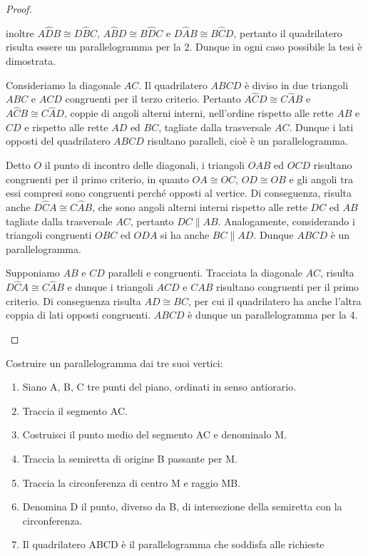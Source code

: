 \begin{proof}
\begin{enumerate*}
		inoltre $A\widehat{D}B\cong D\widehat{B}C$, $A\widehat{B}D\cong 
		B\widehat{D}C$ e $D\widehat{A}B\cong B\widehat{C}D$, pertanto il 
		quadrilatero risulta essere un parallelogramma per la 2. Dunque in 
		ogni caso possibile la tesi è dimostrata.
		\item Consideriamo la diagonale $AC$. Il quadrilatero $ABCD$ è diviso 
		in due triangoli $ABC$ e $ACD$ congruenti per il terzo criterio. 
		Pertanto $A\widehat{C}D\cong C\widehat{A}B$ e $A\widehat{C}B\cong 
		C\widehat{A}D$, coppie di angoli alterni interni, nell'ordine 
		rispetto alle rette $AB$ e $CD$ e rispetto alle rette $AD$ ed $BC$, 
		tagliate dalla trasversale $AC$. Dunque i lati opposti del 
		quadrilatero $ABCD$ risultano paralleli, cioè è un parallelogramma.
		\item Detto $O$ il punto di incontro delle diagonali, i triangoli 
		$OAB$ ed $OCD$ risultano congruenti per il primo criterio, in quanto 
		$OA\cong OC$, $OD\cong OB$ e gli angoli tra essi compresi sono 
		congruenti perché opposti al vertice. Di conseguenza, risulta anche 
		$D\widehat{C}A\cong C\widehat{A}B$, che sono angoli alterni interni 
		rispetto alle rette $DC$ ed $AB$ tagliate dalla trasversale $AC$, 
		pertanto $DC\parallel AB$. Analogamente, considerando i triangoli 
		congruenti $OBC$ ed $ODA$ si ha anche $BC\parallel AD$. Dunque $ABCD$ 
		è un parallelogramma.
		\item Supponiamo $AB$ e $CD$ paralleli e congruenti. Tracciata la 
		diagonale $AC$, risulta $D\widehat{C}A\cong C\widehat{A}B$ e dunque i 
		triangoli $ACD$ e $CAB$ risultano congruenti per il primo criterio. 
		Di conseguenza risulta $AD\cong BC$, per cui il quadrilatero ha anche 
		l'altra coppia di lati opposti congruenti. $ABCD$ è dunque un 
		parallelogramma per la 4.
	\end{enumerate*}
\end{proof}


\begin{procedura}
	Costruire un parallelogramma dai tre suoi vertici:
	\begin{enumerate} [nosep]
		\item 
		Siano A, B, C tre punti del piano, ordinati in senso antiorario.
		\item 
		Traccia il segmento AC.
		\item 
		Costruisci il punto medio del segmento AC e denominalo M.
		\item 
		Traccia la semiretta di origine B passante per M.
		\item 
		Tracci­a la circonferenza di centro M e raggio MB.
		\item 
		Denomina D il punto,  diverso da B, di intersezione della semiretta con la circonferenza.
		\item 
		Il quadrilatero ABCD è il parallelogramma che soddisfa alle richieste
	\end{enumerate}
\end{procedura}


